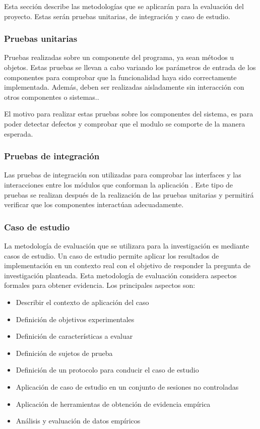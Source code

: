 \documentclass[11pt,letterpaper]{article}
\begin{document}
Esta sección describe las metodologías que se aplicarán para la evaluación del proyecto. Estas serán pruebas unitarias, de integración y caso de estudio.

\subsubsection{Pruebas unitarias}
Pruebas realizadas sobre un componente del programa, ya sean métodos u objetos. Estas pruebas se llevan a cabo variando los parámetros de entrada de los componentes para comprobar que la funcionalidad haya sido correctamente implementada. Además, deben ser realizadas aisladamente sin interacción con otros componentes o sistemas.\cite{Sommerville2010}.

El motivo para realizar estas pruebas sobre los componentes del sistema, es para poder detectar defectos y comprobar que el modulo se comporte de la manera esperada.

\subsubsection{Pruebas de integración}
Las pruebas de integración son utilizadas para comprobar las interfaces y las interacciones entre los módulos que conforman la aplicación \cite{Leung1990}. Este tipo de pruebas se realizan después de la realización de las pruebas unitarias y permitirá verificar que  los componentes interactúan  adecuadamente. 

\subsubsection{Caso de estudio}
La metodología de evaluación \cite{Runeson2009} que se utilizara para la investigación es mediante casos de estudio. Un caso de estudio permite aplicar los resultados de implementación en un contexto real con el objetivo de responder la pregunta de investigación planteada. Esta metodología de evaluación considera aspectos formales para obtener evidencia. Los principales aspectos son:

\begin{itemize}
\item Describir el contexto de aplicación del caso
\item Definición de objetivos experimentales
\item Definición de características a evaluar
\item Definición de sujetos de prueba
\item Definición de un protocolo para conducir el caso de estudio
\item Aplicación de caso de estudio en un conjunto de sesiones no controladas
\item Aplicación de herramientas de obtención de evidencia empírica
\item Análisis y evaluación de datos empíricos
\end{itemize}
\end{document}
